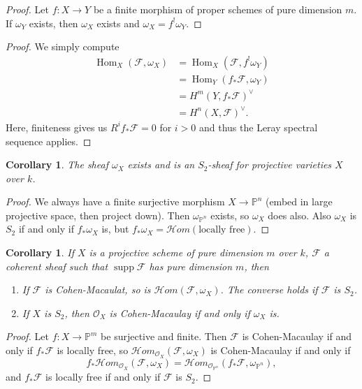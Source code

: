 \documentclass[leqno, openany]{memoir}
\newtheorem{cor}[thm]{Corollary}
\theoremstyle{definition}
\theoremstyle{remark}
\theoremstyle{plain}
\theoremstyle{definition}
\theoremstyle{remark}
\renewcommand{\P}{\mathbb{P}}
\newcommand{\msc}[1]{\mathscr{#1}}
\DeclareMathOperator{\Hom}{Hom}
\DeclareMathOperator{\supp}{supp}
\begin{document}
\begin{proof}
    Let $f \colon X \to Y$ be a finite morphism of proper schemes of pure dimension $m$. If $\omega_Y$ exists, then $\omega_X$ exists and $\omega_X = f^! \omega_Y$.
\end{proof}

\begin{proof}
    We simply compute
    \begin{align*}
        \Hom_X(\msc{F}, \omega_X) &= \Hom_X(\msc{F}, f^! \omega_Y) \\
                                  &= \Hom_Y(f_* \msc{F}, \omega_Y) \\
                                  &= { H^m(Y, f_* \msc{F}) }^{\vee} \\
                                  &= { H^n(X, \msc{F}) }^{\vee}.
    \end{align*}
    Here, finiteness gives us $R^i f_* \msc{F} = 0$ for $i > 0$ and thus the Leray spectral sequence applies.
\end{proof}

\begin{cor}
    The sheaf $\omega_X$ exists and is an $S_2$-sheaf for projective varieties $X$ over $k$.
\end{cor}

\begin{proof}
    We always have a finite surjective morphism $X \to \P^n$ (embed in large projective space, then project down). Then $\omega_{\P^n}$ exists, so $\omega_X$ does also. Also $\omega_X$ is $S_2$ if and only if $f_* \omega_X$ is, but $f_* \omega_X = \msc{H}om(\text{locally free})$. 
\end{proof}

\begin{cor}
    If $X$ is a projective scheme of pure dimension $m$ over $k$, $\msc{F}$ a coherent sheaf such that $\supp \msc{F}$ has pure dimension $m$, then
    \begin{enumerate}
        \item If $\msc{F}$ is Cohen-Macaulat, so is $\msc{H}om(\msc{F}, \omega_X)$. The converse holds if $\msc{F}$ is $S_2$.
        \item If $X$ is $S_2$, then $\msc{O}_X$ is Cohen-Macaulay if and only if $\omega_X$ is.
    \end{enumerate}
\end{cor}

\begin{proof}
    Let $f \colon X \to \P^m$ be surjective and finite. Then $\msc{F}$ is Cohen-Macaulay if and only if $f_* \msc{F}$ is locally free, so $\msc{H}om_{\msc{O}_X}(\msc{F}, \omega_X)$ is Cohen-Macaulay if and only if
    \[ f_* \msc{H}om_{\msc{O}_X} (\msc{F}, \omega_X) = \msc{H}om_{\msc{O}_{\P^n}}(f_* \msc{F}, \omega_{\P^n}), \]
    and $f_* \msc{F}$ is locally free if and only if $\msc{F}$ is $S_2$.
\end{proof}
\end{document}

